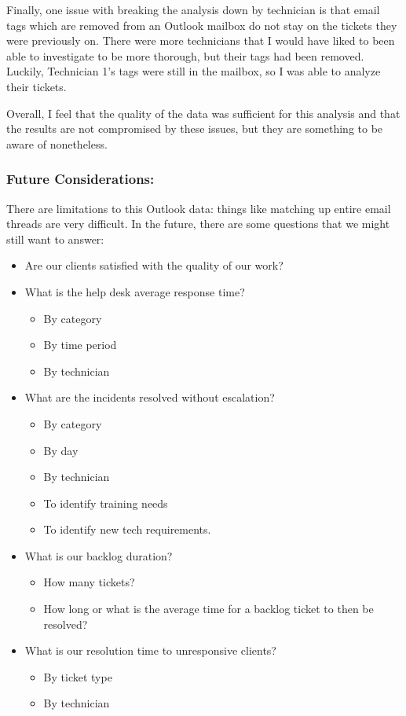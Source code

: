 \documentclass[11pt]{article}
\providecommand{\tightlist}{%
      \setlength{\itemsep}{0pt}\setlength{\parskip}{0pt}}
\begin{document}
Finally, one issue with breaking the analysis down by technician is that
email tags which are removed from an Outlook mailbox do not stay on the
tickets they were previously on. There were more technicians that I
would have liked to been able to investigate to be more thorough, but
their tags had been removed. Luckily, Technician 1's tags were still in
the mailbox, so I was able to analyze their tickets.

Overall, I feel that the quality of the data was sufficient for this
analysis and that the results are not compromised by these issues, but
they are something to be aware of nonetheless.

\hypertarget{future-considerations}{%
\subsubsection{Future Considerations:}\label{future-considerations}}

There are limitations to this Outlook data: things like matching up
entire email threads are very difficult. In the future, there are some
questions that we might still want to answer:

\begin{itemize}
\item
  Are our clients satisfied with the quality of our work?
\item
  What is the help desk average response time?

  \begin{itemize}
  \tightlist
  \item
    By category
  \item
    By time period
  \item
    By technician
  \end{itemize}
\item
  What are the incidents resolved without escalation?

  \begin{itemize}
  \tightlist
  \item
    By category
  \item
    By day
  \item
    By technician
  \item
    To identify training needs
  \item
    To identify new tech requirements.
  \end{itemize}
\item
  What is our backlog duration?

  \begin{itemize}
  \tightlist
  \item
    How many tickets?
  \item
    How long or what is the average time for a backlog ticket to then be
    resolved?
  \end{itemize}
\item
  What is our resolution time to unresponsive clients?

  \begin{itemize}
  \tightlist
  \item
    By ticket type
  \item
    By technician
  \end{itemize}
\end{itemize}

   



    
\end{document}
